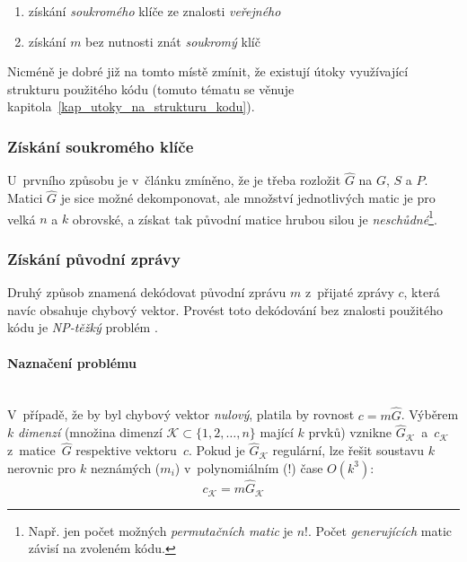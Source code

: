 \documentclass[thesis=M,czech,hidelinks]{FITthesis}[2012/06/26]
\newcommand{\0}{{\textcolor[gray]{0.80}{0}}}
\begin{document}
\begin{enumerate}
    \item získání \emph{soukromého} klíče ze znalosti \emph{veřejného}
    \item získání $m$ bez nutnosti znát \emph{soukromý} klíč
\end{enumerate}

Nicméně je dobré již na tomto místě zmínit, že existují útoky využívající
strukturu použitého kódu (tomuto tématu se věnuje
kapitola~\ref{kap_utoky_na_strukturu_kodu}).

\subsubsection{Získání soukromého klíče}

U~prvního způsobu je v~článku zmíněno, že je třeba rozložit $\hat{G}$ na $G$,
$S$ a $P$.  Matici $\hat{G}$ je sice možné dekomponovat, ale množství
jednotlivých matic je pro velká $n$ a $k$ obrovské, a získat tak původní matice
hrubou silou je \emph{neschůdné}\footnote{
    Např. jen počet možných \emph{permutačních matic} je $n!$. Počet
    \emph{generujících} matic závisí na zvoleném kódu.
}.


\subsubsection{Získání původní zprávy}

Druhý způsob znamená dekódovat původní zprávu $m$ z~přijaté zprávy $c$, která
navíc obsahuje chybový vektor. Provést toto dekódování bez znalosti použitého
kódu je \emph{NP-těžký} problém \cite{Berlekamp1}.

\paragraph{Naznačení problému} \hfil \\
V~případě, že by byl chybový vektor \emph{nulový}, platila by rovnost $c =
m\hat{G}$. Výběrem $k$ \emph{dimenzí} (množina dimenzí $\mathcal{K} \subset
\{1,2,\ldots,n\}$ mající $k$ prvků) vznikne
$\hat{G}_{\mathcal{K}}$~a~$c_{\mathcal{K}}$ z~matice~$\hat{G}$ respektive
vektoru~$c$. Pokud je $\hat{G}_{\mathcal{K}}$ regulární, lze řešit soustavu $k$
nerovnic pro $k$ neznámých ($m_i$) v~polynomiálním (!) čase $O\left(k^3\right)$:
$$ c_{\mathcal{K}} = m \hat{G}_{\mathcal{K}} $$
\end{document}
